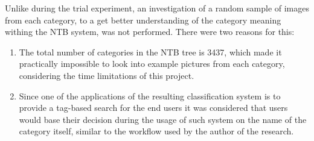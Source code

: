     
    Unlike during the trial experiment, an investigation of a random sample of images from each category, to a get better understanding of the category meaning withing the NTB system, was not performed. There were two reasons for this:
    
    \begin{enumerate}
        \item The total number of categories in the NTB tree is 3437, which made it practically impossible to look into example pictures from each category, considering the time limitations of this project. 
        \item Since one of the applications of the resulting classification system is to provide a tag-based search for the end users it was considered that users would base their decision during the usage of such system on the name of the category itself, similar to the workflow used by the author of the research.
    \end{enumerate}
    
